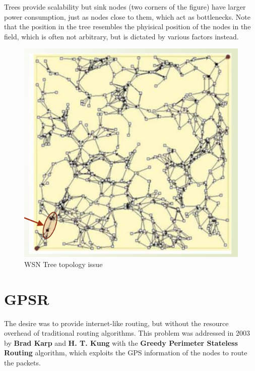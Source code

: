 \begin{paracol}{2}
   Trees provide scalability but sink nodes (two corners of the figure) have larger power consumption, just as nodes close to them, which act as bottlenecks.
   Note that the position in the tree resembles the phyisical position of the nodes in the field, which is often not arbitrary, but is dictated by various factors instead.   
   \switchcolumn
   \begin{figure}[htbp]
      \centering
      \includegraphics{images/ddiff_trees.png}
      \caption{WSN Tree topology issue}
      \label{fig:ddiff_trees}
   \end{figure}
\end{paracol}

\section{GPSR}
The desire was to provide internet-like routing, but without the resource overhead of traditional routing algorithms.
This problem was addressed in 2003 by \textbf{Brad Karp} and \textbf{H. T. Kung} with the \textbf{Greedy Perimeter Stateless Routing} algorithm, which exploits the GPS information of the nodes to route the packets.

